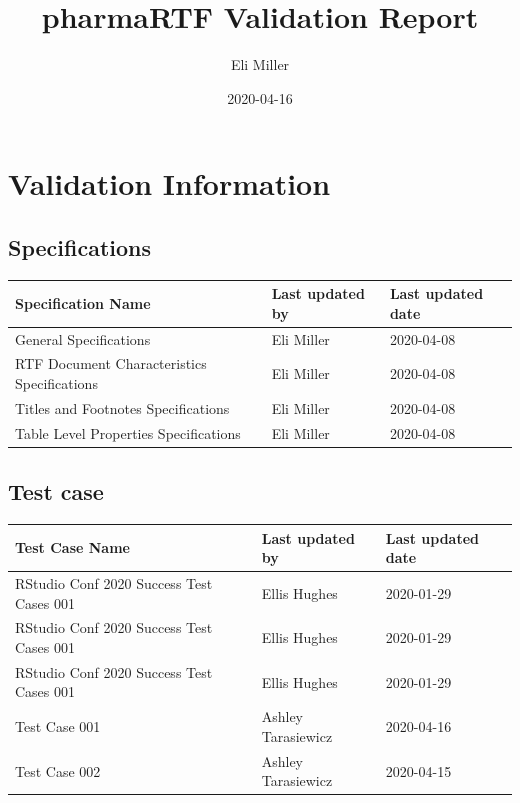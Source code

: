 \documentclass[]{article}
\title{pharmaRTF Validation Report}
\author{Eli Miller}
\date{2020-04-16}
\begin{document}
\maketitle

\newpage
\tableofcontents
\newpage

\hypertarget{validation-information}{%
\section{Validation Information}\label{validation-information}}

\hypertarget{specifications}{%
\subsection{Specifications}\label{specifications}}

\begin{table}[H]
\centering
\begin{tabular}{l|l|l}
\hline
Specification Name & Last updated by & Last updated date\\
\hline
General Specifications & Eli Miller & 2020-04-08\\
\hline
RTF Document Characteristics Specifications & Eli Miller & 2020-04-08\\
\hline
Titles and Footnotes Specifications & Eli Miller & 2020-04-08\\
\hline
Table Level Properties Specifications & Eli Miller & 2020-04-08\\
\hline
\end{tabular}
\end{table}

\hypertarget{test-case}{%
\subsection{Test case}\label{test-case}}

\begin{table}[H]
\centering
\begin{tabular}{l|l|l}
\hline
Test Case Name & Last updated by & Last updated date\\
\hline
RStudio Conf 2020 Success Test Cases 001 & Ellis Hughes & 2020-01-29\\
\hline
RStudio Conf 2020 Success Test Cases 001 & Ellis Hughes & 2020-01-29\\
\hline
RStudio Conf 2020 Success Test Cases 001 & Ellis Hughes & 2020-01-29\\
\hline
Test Case 001 & Ashley Tarasiewicz & 2020-04-16\\
\hline
Test Case 002 & Ashley Tarasiewicz & 2020-04-15\\
\hline
\end{tabular}
\end{table}
\end{document}
